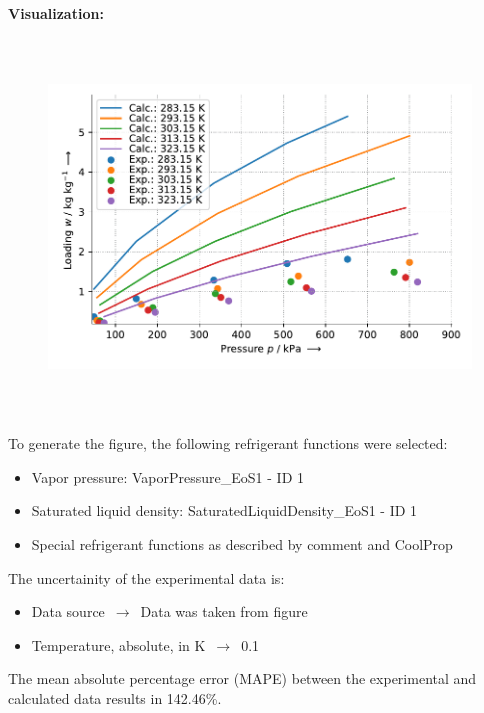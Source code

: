 \textbf{Visualization:}
%
\begin{figure}[!htp]
{\noindent\includegraphics[height=10cm, keepaspectratio]{figs/ads/ads_R-410a_activated_carbon_powder_Maxsorb_III_DubininAstakhov_1.pdf}}
\end{figure}
%

To generate the figure, the following refrigerant functions were selected:
\begin{itemize}
\item Vapor pressure: VaporPressure\_EoS1 - ID 1
\item Saturated liquid density: SaturatedLiquidDensity\_EoS1 - ID 1
\item Special refrigerant functions as described by comment and CoolProp
\end{itemize}

The uncertainity of the experimental data is:
\begin{itemize}
\item Data source $\,\to\,$ Data was taken from figure
\item Temperature, absolute, in $\si{\kelvin}$ $\,\to\,$ 0.1
\end{itemize}

The mean absolute percentage error (MAPE) between the experimental and calculated data results in 142.46\%.
\FloatBarrier
\newpage
